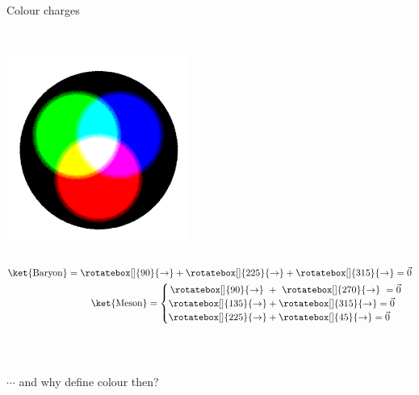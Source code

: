 \begin{frame}{Colour charges}
    \begin{column}{.58\textwidth}
\\ \includegraphics[width=6cm]{Figures Introductory Lecture/Standard Model/BlackAdditiveColours.png}
\end{column}%
\begin{column}{.42\textwidth}

\begin{align*}
    \ket{\textmd{Baryon}}=\rotatebox[]{90}{\rightarrow}+\rotatebox[]{225}{\rightarrow}+\rotatebox[]{315}{\rightarrow}=\Vec{0}\\ 
    \ket{\textmd{Meson}}=
    \begin{cases} \,\rotatebox[]{90}{\rightarrow}~+~\rotatebox[]{270}{\rightarrow}~=\Vec{0}\\
    \rotatebox[]{135}{\rightarrow}+\rotatebox[]{315}{\rightarrow}=\Vec{0}\\
    \rotatebox[]{225}{\rightarrow}+\rotatebox[]{45}{\rightarrow}=\Vec{0}
    \end{cases} 
\end{align*} %
 \\\

 $\cdots$ and why define colour then?
 \end{column}
 \end{frame}

